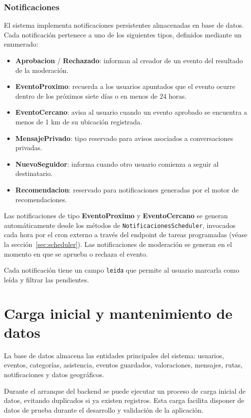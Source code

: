 \subsubsection{Notificaciones}

El sistema implementa notificaciones persistentes almacenadas en base de datos. Cada notificación pertenece a uno de los siguientes tipos, definidos mediante un enumerado:

\begin{itemize}
    \item \textbf{Aprobacion} / \textbf{Rechazado}: informan al creador de un evento del resultado de la moderación.
    \item \textbf{EventoProximo}: recuerda a los usuarios apuntados que el evento ocurre dentro de los próximos siete días o en menos de 24 horas.
    \item \textbf{EventoCercano}: avisa al usuario cuando un evento aprobado se encuentra a menos de 1 km de su ubicación registrada.
    \item \textbf{MensajePrivado}: tipo reservado para avisos asociados a conversaciones privadas.
    \item \textbf{NuevoSeguidor}: informa cuando otro usuario comienza a seguir al destinatario.
    \item \textbf{Recomendacion}: reservado para notificaciones generadas por el motor de recomendaciones.
\end{itemize}

Las notificaciones de tipo \textbf{EventoProximo} y \textbf{EventoCercano} se generan automáticamente desde los métodos de \texttt{NotificacionesScheduler}, invocados cada hora por el cron externo a través del endpoint de tareas programadas (véase la sección~\ref{sec:scheduler}). Las notificaciones de moderación se generan en el momento en que se aprueba o rechaza el evento.

Cada notificación tiene un campo \texttt{leida} que permite al usuario marcarla como leída y filtrar las pendientes.

\section{Carga inicial y mantenimiento de datos}

La base de datos almacena las entidades principales del sistema: usuarios, eventos, categorías, asistencia, eventos guardados, valoraciones, mensajes, rutas, notificaciones y datos geográficos.

Durante el arranque del backend se puede ejecutar un proceso de carga inicial de datos, evitando duplicados si ya existen registros. Esta carga facilita disponer de datos de prueba durante el desarrollo y validación de la aplicación.

